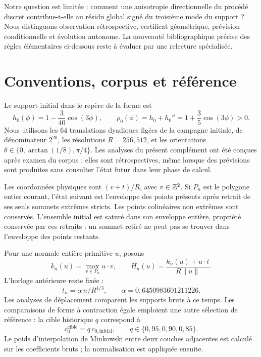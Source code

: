 \documentclass[11pt,a4paper]{article}
\begin{document}
Notre question est limitée : comment une anisotropie directionnelle du procédé discret contribue-t-elle au résidu global signé du troisième mode du support ? Nous distinguons observation rétrospective, certificat géométrique, prévision conditionnelle et évolution autonome. La nouveauté bibliographique précise des règles élémentaires ci-dessous reste à évaluer par une relecture spécialisée.

\newpage
\section{Conventions, corpus et référence}
Le support initial dans le repère de la forme est
\begin{equation}
h_0(\phi)=1-\frac{3}{40}\cos(3\phi),\qquad
\rho_0(\phi)=h_0+h_0''=1+\frac35\cos(3\phi)>0.
\end{equation}
Nous utilisons les 64 translations dyadiques figées de la campagne initiale, de dénominateur $2^{20}$, les résolutions $R=256,512$, et les orientations $\theta\in\{0,\arctan(1/8),\pi/4\}$. Les analyses du présent complément ont été conçues après examen du corpus : elles sont rétrospectives, même lorsque des prévisions sont produites sans consulter l'état futur dans leur phase de calcul.

Les coordonnées physiques sont $(v+t)/R$, avec $v\in\mathbb Z^2$. Si $P_n$ est le polygone entier courant, l'état suivant est l'enveloppe des points présents après retrait de ses seuls sommets extrêmes stricts. Les points colinéaires non extrêmes sont conservés. L'ensemble initial est saturé dans son enveloppe entière, propriété conservée par ces retraits : un sommet retiré ne peut pas se trouver dans l'enveloppe des points restants.

Pour une normale entière primitive $u$, posons
\begin{equation}
k_n(u)=\max_{v\in P_n}u\cdot v,\qquad
H_n(u)=\frac{k_n(u)+u\cdot t}{R\|u\|}.
\end{equation}
L'horloge antérieure reste fixée :
\begin{equation}
t_n=\alpha\,n/R^{4/3},\qquad \alpha=0{,}6450983601211226.
\end{equation}
Les analyses de déplacement comparent les supports bruts à ce temps. Les comparaisons de forme à contraction égale emploient une autre sélection de référence : la cible historique $q$ correspond à
\begin{equation}
c_0^{\mathrm{cible}}=q\,c_{0,\mathrm{initial}},\qquad q\in\{0{,}95,0{,}90,0{,}85\}.
\end{equation}
Le poids d'interpolation de Minkowski entre deux couches adjacentes est calculé sur les coefficients bruts ; la normalisation est appliquée ensuite.
\end{document}

